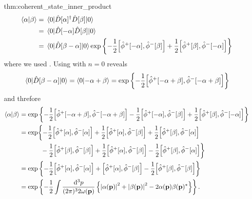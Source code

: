 \begin{delayedproof}{thm:coherent_state_inner_product}
	\begin{equation*}
		\begin{split}
			\braket{\alpha}{\beta}
			&=
			\expval{
				\hat{D}[\alpha]^\dagger
				\hat{D}[\beta]
			}{0}
			\\
			&=
			\expval{
				\hat{D}[-\alpha]
				\hat{D}[\beta]
			}{0}
			\\
			&=
			\expval{
				\hat{D}[\beta-\alpha]
			}{0}
			\exp\left\{
				-
				\frac{1}{2}
				\comm{\hat\phi^+[-\alpha]}{\hat\phi^-[\beta]}
				+
				\frac{1}{2}
				\comm{\hat\phi^+[\beta]}{\hat\phi^-[-\alpha]}
			\right\}
		\end{split}
	\end{equation*}
	where we used .
	Using  with $n=0$ reveals
	\begin{equation*}
		\expval{\hat{D}[\beta-\alpha]}{0}
		=
		\braket{0}{-\alpha+\beta}
		=
		\exp\left\{
			-
			\frac{1}{2}
			\comm{\hat\phi^+[-\alpha+\beta]}{\hat\phi^-[-\alpha+\beta]}
		\right\}
	\end{equation*}
	and threfore
	\begin{equation*}
		\begin{split}
			\braket{\alpha}{\beta}
			&=
			\exp\left\{
				-
				\frac{1}{2}
				\comm{\hat\phi^+[-\alpha+\beta]}{\hat\phi^-[-\alpha+\beta]}
				-
				\frac{1}{2}
				\comm{\hat\phi^+[-\alpha]}{\hat\phi^-[\beta]}
				+
				\frac{1}{2}
				\comm{\hat\phi^+[\beta]}{\hat\phi^-[-\alpha]}
			\right\}
			\\
			&=
			\exp\biggl\{
				-
				\frac{1}{2}
				\comm{\hat\phi^+[\alpha]}{\hat\phi^-[\alpha]}
				+
				\frac{1}{2}
				\comm{\hat\phi^+[\alpha]}{\hat\phi^-[\beta]}
				+
				\frac{1}{2}
				\comm{\hat\phi^+[\beta]}{\hat\phi^-[\alpha]}
				\\
				&\ \ \ \ \ \ \ \ \ \
				-
				\frac{1}{2}
				\comm{\hat\phi^+[\beta]}{\hat\phi^-[\beta]}
				+
				\frac{1}{2}
				\comm{\hat\phi^+[\alpha]}{\hat\phi^-[\beta]}
				-
				\frac{1}{2}
				\comm{\hat\phi^+[\beta]}{\hat\phi^-[\alpha]}
			\biggr\}
			\\
			&=
			\exp\left\{
				-
				\frac{1}{2}
				\comm{\hat\phi^+[\alpha]}{\hat\phi^-[\alpha]}
				+
				\comm{\hat\phi^+[\alpha]}{\hat\phi^-[\beta]}
				-
				\frac{1}{2}
				\comm{\hat\phi^+[\beta]}{\hat\phi^-[\beta]}
			\right\}
			\\
			&=
			\exp\left\{
				-
				\frac{1}{2}
				\int\frac{\dd[3]{p}}{(2\pi)^32\omega(\vb{p})}
				\left\{
					\abs{\alpha(\vb{p})}^2
					+
					\abs{\beta(\vb{p})}^2
					-
					2\alpha(\vb{p})\beta(\vb{p})^*
				\right\}
			\right\}
			.
		\end{split}
	\end{equation*}
\end{delayedproof}
